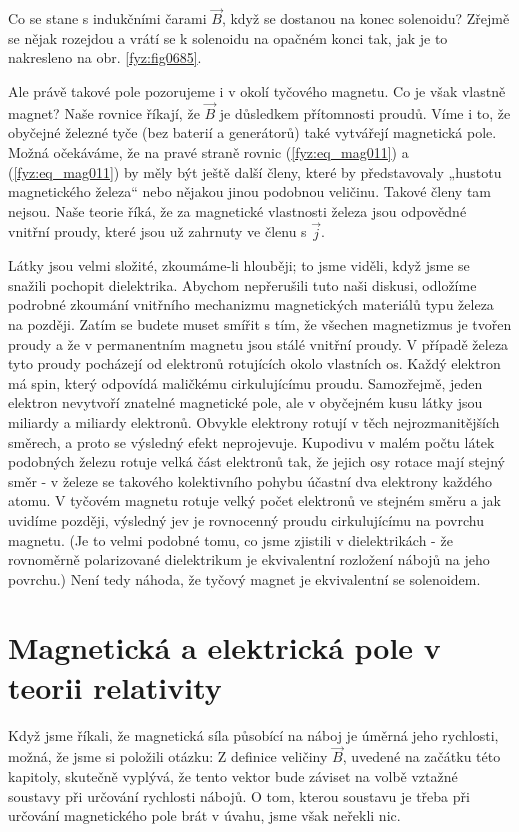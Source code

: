     Co se stane s indukčními čarami \(\vec{B}\), když se dostanou na konec solenoidu? Zřejmě se
    nějak rozejdou a vrátí se k solenoidu na opačném konci tak, jak je to nakresleno na obr.
    \ref{fyz:fig0685}.

    Ale právě takové pole pozorujeme i v okolí tyčového magnetu. Co je však vlastně magnet? Naše
    rovnice říkají, že \(\vec{B}\) je důsledkem přítomnosti proudů. Víme i to, že obyčejné železné
    tyče (bez baterií a generátorů) také vytvářejí magnetická pole. Možná očekáváme, že na pravé
    straně rovnic (\ref{fyz:eq_mag011}) a (\ref{fyz:eq_mag011}) by měly být ještě další členy, které
    by představovaly „hustotu magnetického železa“ nebo nějakou jinou podobnou veličinu. Takové
    členy tam nejsou. Naše teorie říká, že za magnetické vlastnosti železa jsou odpovědné vnitřní
    proudy, které jsou už zahrnuty ve členu s \(\vec{j}\).

    Látky jsou velmi složité, zkoumáme-li hlouběji; to jsme viděli, když jsme se snažili pochopit 
    dielektrika. Abychom nepřerušili tuto naši diskusi, odložíme podrobné zkoumání vnitřního
    mechanizmu magnetických materiálů typu železa na později. Zatím se budete muset smířit s tím, že
    všechen magnetizmus je tvořen proudy a že v permanentním magnetu jsou stálé vnitřní proudy. V
    případě železa tyto proudy pocházejí od elektronů rotujících okolo vlastních os. Každý elektron
    má spin, který odpovídá maličkému cirkulujícímu proudu. Samozřejmě, jeden elektron nevytvoří
    znatelné magnetické pole, ale v obyčejném kusu látky jsou miliardy a miliardy elektronů. Obvykle
    elektrony rotují v těch nejrozmanitějších směrech, a proto se výsledný efekt neprojevuje.
    Kupodivu v malém počtu látek podobných železu rotuje velká část elektronů tak, že jejich osy
    rotace mají stejný směr - v železe se takového kolektivního pohybu účastní dva elektrony každého
    atomu. V tyčovém magnetu rotuje velký počet elektronů ve stejném směru a jak uvidíme později,
    výsledný jev je rovnocenný proudu cirkulujícímu na povrchu magnetu. (Je to velmi podobné tomu,
    co jsme zjistili v dielektrikách - že rovnoměrně polarizované dielektrikum je ekvivalentní
    rozložení nábojů na jeho povrchu.) Není tedy náhoda, že tyčový magnet je ekvivalentní se
    solenoidem.

  \section{Magnetická a elektrická pole v teorii relativity}\label{fyz:IIchapXIIIsecVI}
    Když jsme říkali, že magnetická síla působící na náboj je úměrná jeho rychlosti, možná, že jsme
    si položili otázku:  Z definice
    veličiny \(\vec{B}\), uvedené na začátku této kapitoly, skutečně vyplývá, že tento vektor bude
    záviset na volbě vztažné soustavy při určování rychlosti nábojů. O tom, kterou soustavu je třeba
    při určování magnetického pole brát v úvahu, jsme však neřekli nic.
    
